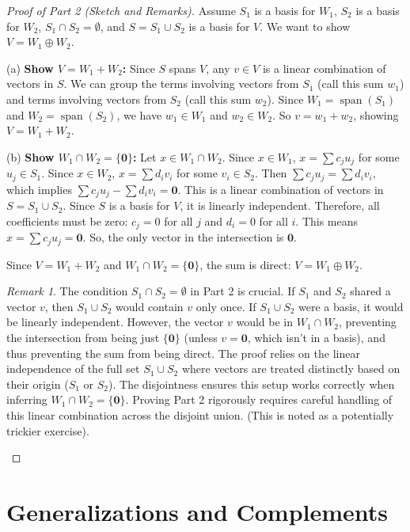 \documentclass[11pt]{article}
\theoremstyle{plain}
\theoremstyle{definition}
\theoremstyle{remark}
\newtheorem{remark}[theorem]{Remark}
\DeclareMathOperator{\spanv}{span}
\newcommand{\veczero}{\mathbf{0}} %
\begin{document}
\begin{proof}[Proof of Part 2 (Sketch and Remarks)]
Assume $S_1$ is a basis for $W_1$, $S_2$ is a basis for $W_2$, $S_1 \cap S_2 = \emptyset$, and $S = S_1 \cup S_2$ is a basis for $V$. We want to show $V = W_1 \oplus W_2$.

(a) \textbf{Show $V = W_1 + W_2$:} Since $S$ spans $V$, any $v \in V$ is a linear combination of vectors in $S$. We can group the terms involving vectors from $S_1$ (call this sum $w_1$) and terms involving vectors from $S_2$ (call this sum $w_2$). Since $W_1 = \spanv(S_1)$ and $W_2 = \spanv(S_2)$, we have $w_1 \in W_1$ and $w_2 \in W_2$. So $v = w_1 + w_2$, showing $V = W_1 + W_2$.

(b) \textbf{Show $W_1 \cap W_2 = \{\veczero\}$:} Let $x \in W_1 \cap W_2$.
Since $x \in W_1$, $x = \sum c_j u_j$ for some $u_j \in S_1$.
Since $x \in W_2$, $x = \sum d_i v_i$ for some $v_i \in S_2$.
Then $\sum c_j u_j = \sum d_i v_i$, which implies $\sum c_j u_j - \sum d_i v_i = \veczero$.
This is a linear combination of vectors in $S = S_1 \cup S_2$. Since $S$ is a basis for $V$, it is linearly independent. Therefore, all coefficients must be zero: $c_j = 0$ for all $j$ and $d_i = 0$ for all $i$.
This means $x = \sum c_j u_j = \veczero$.
So, the only vector in the intersection is $\veczero$.

Since $V = W_1 + W_2$ and $W_1 \cap W_2 = \{\veczero\}$, the sum is direct: $V = W_1 \oplus W_2$.

\begin{remark}
The condition $S_1 \cap S_2 = \emptyset$ in Part 2 is crucial. If $S_1$ and $S_2$ shared a vector $v$, then $S_1 \cup S_2$ would contain $v$ only once. If $S_1 \cup S_2$ were a basis, it would be linearly independent. However, the vector $v$ would be in $W_1 \cap W_2$, preventing the intersection from being just $\{\veczero\}$ (unless $v=\veczero$, which isn't in a basis), and thus preventing the sum from being direct. The proof relies on the linear independence of the full set $S_1 \cup S_2$ where vectors are treated distinctly based on their origin ($S_1$ or $S_2$). The disjointness ensures this setup works correctly when inferring $W_1 \cap W_2 = \{\veczero\}$. Proving Part 2 rigorously requires careful handling of this linear combination across the disjoint union. (This is noted as a potentially trickier exercise).
\end{remark}
\end{proof}

\section{Generalizations and Complements}
\end{document}
